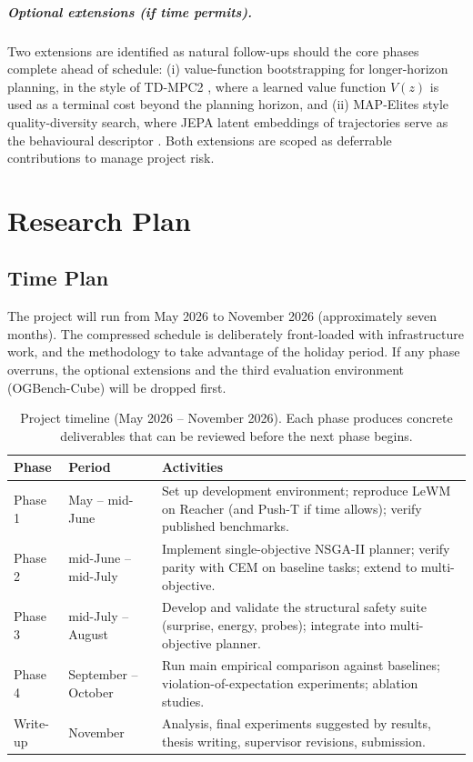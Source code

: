 \documentclass[a4paper,twoside,12pt]{report}
\begin{document}
\paragraph{Optional extensions (if time permits).} Two extensions are identified as natural follow-ups should the core phases complete ahead of schedule: (i) value-function bootstrapping for longer-horizon planning, in the style of TD-MPC2 \citep{hansen2024tdmpc2}, where a learned value function $V(z)$ is used as a terminal cost beyond the planning horizon, and (ii) MAP-Elites style quality-diversity search, where JEPA latent embeddings of trajectories serve as the behavioural descriptor \citep{mouret2015mapelites}. Both extensions are scoped as deferrable contributions to manage project risk.

\chapter{Research Plan}\label{ch:plan}

\section{Time Plan}

The project will run from May 2026 to November 2026 (approximately seven months). The compressed schedule is deliberately front-loaded with infrastructure work, and the methodology to take advantage of the holiday period. If any phase overruns, the optional extensions and the third evaluation environment (OGBench-Cube) will be dropped first.

\begin{table}[ht]
\centering
\caption[Project timeline.]{Project timeline (May 2026 -- November 2026). Each phase produces concrete deliverables that can be reviewed before the next phase begins.}
\label{tab:timeplan}
\begin{tabular}{@{}llp{9cm}@{}}
\toprule
\textbf{Phase} & \textbf{Period} & \textbf{Activities} \\
\midrule
Phase 1 & May -- mid-June       & Set up development environment; reproduce LeWM on Reacher (and Push-T if time allows); verify published benchmarks. \\
Phase 2 & mid-June -- mid-July  & Implement single-objective NSGA-II planner; verify parity with CEM on baseline tasks; extend to multi-objective. \\
Phase 3 & mid-July -- August    & Develop and validate the structural safety suite (surprise, energy, probes); integrate into multi-objective planner. \\
Phase 4 & September -- October  & Run main empirical comparison against baselines; violation-of-expectation experiments; ablation studies. \\
Write-up & November             & Analysis, final experiments suggested by results, thesis writing, supervisor revisions, submission. \\
\bottomrule
\end{tabular}
\end{table}
\end{document}
